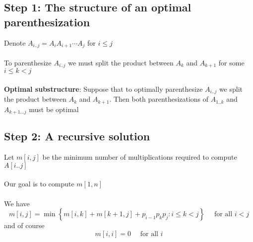 \documentclass{article}[18pt]
\begin{document}
\subsection{Step 1: The structure of an optimal parenthesization}
Denote $A_{i..j}=A_iA_{i+1} \cdots A_j$ for $i\leqslant j$\\
\\
To parenthesize $A_{i..j}$ we must split the product between $A_k$ and $A_{k+1}$ for some $i\leqslant k< j$\\
\\
\textbf{Optimal substructure}: Suppose that to optimally parenthesize $A_{i..j}$ we split the product between $A_k$ and $A_{k+1}$. Then both parenthesizations of $A_{1..k}$ and $A_{k+1...j}$ must be optimal
\subsection{Step 2: A recursive solution}
Let $m[i,j]$ be the minimum number of multiplications required to compute $A[i..j]$\\
\\
Our goal is to compute $m[1,n]$\\
\\
We have
\[
m[i, j]=\min \left\{m[i, k]+m[k+1, j]+p_{i-1} p_{k} p_{j}: i \leq k<j\right\} \quad \text { for all } i<j
\]
and of course
\[
m[i, i]=0 \quad \text { for all } i
\]
\end{document}
